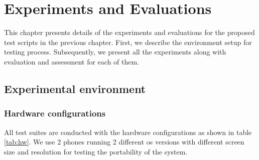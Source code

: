 \chapter{Experiments and Evaluations}
\label{ch:experiments}

This chapter presents details of the experiments and evaluations for the proposed test scripts in the previous chapter.
First, we describe the environment setup for testing process.
Subsequently, we present all the experiments along with evaluation and assessment for each of them.

\section{Experimental environment}

\subsection{Hardware configurations}
All test suites are conducted with the hardware configurations as shown in table \ref{tab:hw}. We use 2 phones running 2 different \acrshort{os} versions with different screen size and resolution for testing the portability of the system.

